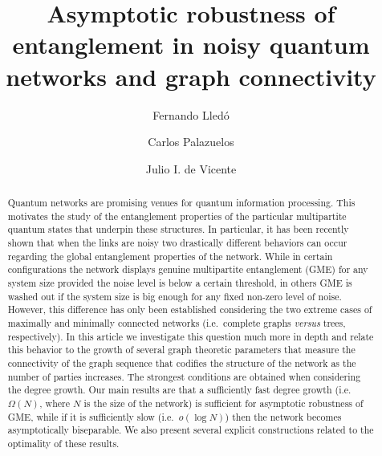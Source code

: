 \documentclass[a4paper,onecolumn,accepted=2024-12-14]{quantumarticle}
\theoremstyle{plain}
\begin{document}
\title{Asymptotic robustness of entanglement in noisy quantum networks
and graph connectivity}



\author{Fernando Lled\'o}
\author{Carlos Palazuelos}
\author{Julio I. de Vicente}

\begin{abstract}
Quantum networks are promising venues for quantum information processing. This motivates the study of the entanglement properties of the particular multipartite quantum states that underpin these structures. In particular, it has been recently shown that when the links are noisy two drastically different behaviors can occur regarding the global entanglement properties of the network. While in certain configurations the network displays genuine multipartite entanglement (GME) for any system size provided the noise level is below a certain threshold, in others GME is washed out if the system size is big enough for any fixed non-zero level of noise. However, this difference has only been established considering the two extreme cases of maximally and minimally connected networks (i.e.\ complete graphs \textit{versus} trees, respectively). In this article we investigate this question much more in depth and relate this behavior to the growth of several graph theoretic parameters that measure the connectivity of the graph sequence that codifies the structure of the network as the number of parties increases. The strongest conditions are obtained when considering the degree growth. Our main results are that a sufficiently fast degree growth (i.e.\ $\Omega(N)$, where $N$ is the size of the network) is sufficient for asymptotic robustness of GME, while if it is sufficiently slow (i.e.\ $o(\log N)$) then the network becomes asymptotically biseparable. We also present several explicit constructions related to the optimality of these results.
\end{abstract}


\end{document}

